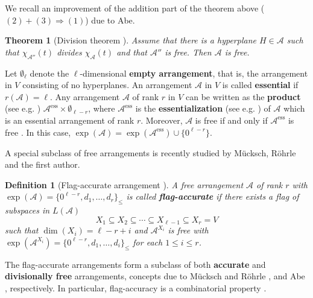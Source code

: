 \documentclass[11pt]{article}
\newtheorem{definition}[theo]{Definition}
\newtheorem{theorem}[theo]{Theorem}
\theoremstyle{definition}
\numberwithin{equation}{section}
\newcommand{\A}{\mathcal{A}}
\newcommand{\tbf}{\textbf}
\begin{document}
We recall an improvement of the addition part of the theorem above ($(2)+(3) \Rightarrow (1)$) due to Abe.

 \begin{theorem}[Division theorem {\cite[Theorem 1.1]{Abe16}}]
 \label{thm:DT}
Assume that there is a hyperplane $H \in\A$ such that $\chi_{\A''}(t)$ divides $\chi_{\A}(t)$  and that $\A''$ is free. Then $\A$ is free.
\end{theorem}

Let $\emptyset_{\ell} $ denote the $ \ell $-dimensional \textbf{empty arrangement}, that is, the arrangement in $ V $ consisting of no hyperplanes. 
An arrangement $ \mathcal{A} $ in $ V $ is called \textbf{essential} if $ r(\mathcal{A}) = \ell $. 
Any arrangement $ \mathcal{A} $ of rank $r$ in $V$ can be written as the \tbf{product} (see e.g. \cite[Definition 2.13]{OT92})  $ \mathcal{A}^{\mathrm{ess}} \times\emptyset_{\ell-r}$, where  $\mathcal{A}^{\mathrm{ess}}$ is the \textbf{essentialization} (see e.g. \cite[\S1.1]{St07}) of $ \mathcal{A} $ which is an essential arrangement   of rank $r$. 
Moreover, $ \mathcal{A} $ is free if and only if $ \mathcal{A}^{\mathrm{ess}} $ is free \cite[Proposition 4.28]{OT92}. 
In this case, $ \exp (\A ) = \exp (\A^{\mathrm{ess}} ) \cup \{ 0^{\ell-r} \} $. 

A special subclass of free arrangements is recently studied by M\"ucksch, R\"ohrle and the first author.

\begin{definition}[Flag-accurate arrangement {\cite[Definition 1.1]{MRT24}}]
\label{def:FA-arr}
A free arrangement $\A$ of rank $r$ with $\exp(\A) = \{0^{\ell-r}, d_1, \ldots, d_{r}\}_\leq$ is called \tbf{flag-accurate} if there exists a flag of subspaces in $L(\A)$
$$X_1 \subseteq X_2  \subseteq \cdots  \subseteq X_{\ell-1} \subseteq X_r=V$$
such that $\dim(X_i)=\ell-r+i$ and $\A^{X_i}$ is free with  $\exp(\A^{X_i}) = \{0^{\ell-r}, d_1, \ldots, d_i\}_ \leq$ for  each $1 \le i \le r$.
\end{definition}

The flag-accurate arrangements form a subclass of both \tbf{accurate} and \tbf{divisionally free} arrangements, concepts due to M\"ucksch and R\"ohrle \cite{MR21}, and Abe \cite{Abe16}, respectively.
In particular,  flag-accuracy is a combinatorial property  \cite[Remark 1.3]{MRT24}.

\end{document}
